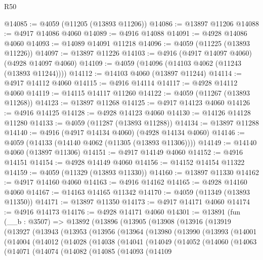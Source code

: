\begin{lexlean}{R50}
\begin{coremodule}
@14085 := @4059 (@11205 (@13893 @11206))
@14086 := @13897 @11206
@14088 := @4917 @14086 @4060
@14089 := @4916 @14088
@14091 := @4928 @14086 @4060
@14093 := @14089 @14091 @11218
@14096 := @4059 (@11225 (@13893 @11226))
@14097 := @13897 @11226
@14103 := @4916 (@4917 @14097 @4060) (@4928 @14097 @4060)
@14109 := @4059 (@14096 (@14103 @4062 (@11243 (@13893 @11244))))
@14112 := @14103 @4060 (@13897 @11244)
@14114 := @4917 @14112 @4060
@14115 := @4916 @14114
@14117 := @4928 @14112 @4060
@14119 := @14115 @14117 @11260
@14122 := @4059 (@11267 (@13893 @11268))
@14123 := @13897 @11268
@14125 := @4917 @14123 @4060
@14126 := @4916 @14125
@14128 := @4928 @14123 @4060
@14130 := @14126 @14128 @11280
@14133 := @4059 (@11287 (@13893 @11288))
@14134 := @13897 @11288
@14140 := @4916 (@4917 @14134 @4060) (@4928 @14134 @4060)
@14146 := @4059 (@14133 (@14140 @4062 (@11305 (@13893 @11306))))
@14149 := @14140 @4060 (@13897 @11306)
@14151 := @4917 @14149 @4060
@14152 := @4916 @14151
@14154 := @4928 @14149 @4060
@14156 := @14152 @14154 @11322
@14159 := @4059 (@11329 (@13893 @11330))
@14160 := @13897 @11330
@14162 := @4917 @14160 @4060
@14163 := @4916 @14162
@14165 := @4928 @14160 @4060
@14167 := @14163 @14165 @11342
@14170 := @4059 (@11349 (@13893 @11350))
@14171 := @13897 @11350
@14173 := @4917 @14171 @4060
@14174 := @4916 @14173
@14176 := @4928 @14171 @4060
@14301 := @13891
    (fun (__b : @3507) =>
    @13892
      (@13896
        (@13905
          (@13908
            (@13916
              (@13919
                (@13927
                  (@13943
                    (@13953
                      (@13956
                        (@13964
                          (@13980
                            (@13990
                              (@13993
                                (@14001
                                  (@14004
                                    (@14012
                                      (@14028
                                        (@14038
                                          (@14041
                                            (@14049
                                              (@14052
                                                (@14060
                                                  (@14063
                                                    (@14071
                                                      (@14074
                                                        (@14082
                                                          (@14085
                                                            (@14093
                                                              (@14109

\end{coremodule}
\end{lexlean}
